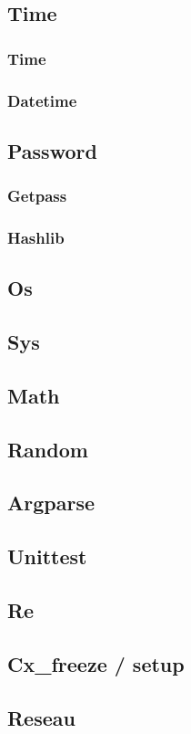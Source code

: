 \documentclass[a4paper, 12pt]{article}
\begin{document}
\subsection{Time}
\subsubsection{Time}
\subsubsection{Datetime}
\subsection{Password}
\subsubsection{Getpass}
\subsubsection{Hashlib}
\subsection{Os}
\subsection{Sys}
\subsection{Math}
\subsection{Random}
\subsection{Argparse}
\subsection{Unittest}
\subsection{Re}
\subsection{Cx\_freeze / setup}
\subsection{Reseau}
\end{document}
